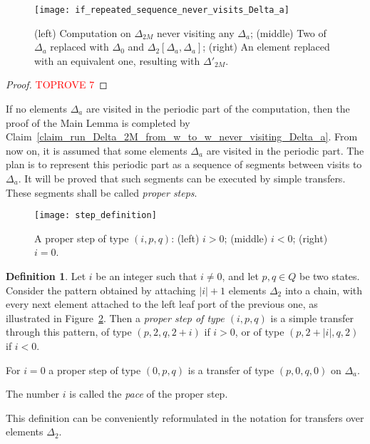 \documentclass[12pt,a4paper]{article}
\theoremstyle{definition}
\newtheorem{definition}{Definition}
\begin{document}
\begin{figure}[t]
	\centerline{\texttt{[image: if\_repeated\_sequence\_never\_visits\_Delta\_a]}}
	\caption{(left) Computation on $\Delta_{2M}$ never visiting any $\Delta_a$;
		(middle) Two of $\Delta_a$ replaced with $\Delta_0$ and $\Delta_2[\Delta_a, \Delta_a]$;
		(right) An element replaced with an equivalent one, resulting with $\Delta'_{2M}$.}
	\label{f:if_repeated_sequence_never_visits_Delta_a}
\end{figure}

\begin{proof}\textcolor{red}{TOPROVE 7}\end{proof}

If no elements $\Delta_a$ are visited in the periodic part of the computation, 
then the proof of the Main Lemma is completed 
by Claim~\ref{claim_run_Delta_2M_from_w_to_w_never_visiting_Delta_a}. 
From now on, it is assumed that some elements $\Delta_a$ are visited in the periodic part.
The plan is to represent this periodic part
as a sequence of segments between visits to $\Delta_a$.
It will be proved that such segments
can be executed by simple transfers.
These segments shall be called \emph{proper steps}.

\begin{figure}[t]
	\centerline{\texttt{[image: step\_definition]}}
	\caption{A proper step of type $(i, p, q)$:
		(left) $i>0$; (middle) $i<0$; (right) $i=0$.}
	\label{f:step_definition}
\end{figure}

\begin{definition}\label{definition_step}
Let $i$ be an integer 
such that $i \neq 0$,
and let $p,q \in Q$ be two states.
Consider the pattern obtained by attaching $|i|+1$ elements $\Delta_2$ into a chain,
with every next element attached to the left leaf port of the previous one,
as illustrated in Figure~\ref{f:step_definition}.
Then a \emph{proper step of type $(i,p,q)$}
is a simple transfer through this pattern,
of type $(p, 2, q, 2+i)$ if $i>0$,
or of type $(p, 2+|i|, q, 2)$ if $i<0$.

For $i=0$ a proper step of type $(0,p,q)$
is a transfer of type $(p, 0, q, 0)$ on $\Delta_a$.

The number $i$ is called the \emph{pace} of the proper step.
\end{definition}

This definition can be conveniently reformulated
in the notation for transfers over elements $\Delta_2$.
\end{document}

